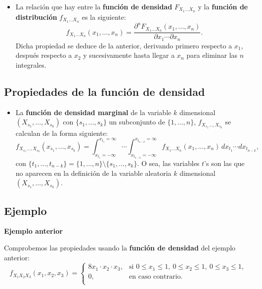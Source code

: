 \documentclass[]{book}
\providecommand{\tightlist}{%
  \setlength{\itemsep}{0pt}\setlength{\parskip}{0pt}}
\begin{document}
\begin{itemize}
\tightlist
\item
  La relación que hay entre la \textbf{función de densidad} \(F_{X_1\ldots X_n}\) y la \textbf{función de distribución} \(f_{X_1\ldots X_n}\) es la siguiente:
  \[
  f_{X_1\ldots X_n}(x_1,\ldots,x_n)=\frac{\partial^n F_{X_1\ldots X_n}(x_1,\ldots,x_n)}{\partial x_1\cdots\partial x_n}.
  \]
  Dicha propiedad se deduce de la anterior, derivando primero respecto a \(x_1\), después respecto a \(x_2\) y sucesivamente hasta llegar a \(x_n\) para eliminar las \(n\) integrales.
\end{itemize}

\hypertarget{propiedades-de-la-funciuxf3n-de-densidad-6}{%
\subsection{Propiedades de la función de densidad}\label{propiedades-de-la-funciuxf3n-de-densidad-6}}

\begin{itemize}
\tightlist
\item
  La \textbf{función de densidad marginal} de la variable \(k\) dimensional \((X_{s_1},\ldots,X_{s_k})\) con \(\{s_1,\ldots, s_k\}\) un subconjunto de \(\{1,\ldots,n\}\), \(f_{X_{s_1}\ldots,X_{s_k}}\) se calculan de la forma siguiente:
  \[
  f_{X_{s_1}\ldots,X_{s_k}}(x_{s_1},\ldots,x_{s_k})=\int_{x_{t_1}=-\infty}^{x_{t_1}=\infty}\cdots \int_{x_{t_{n-k}}=-\infty}^{x_{t_{n-k}}=\infty} f_{X_1\ldots X_n}(x_1,\ldots,x_n)\, dx_{t_1}\cdots dx_{t_{n-k}},
  \]
  con \(\{t_1,\ldots,t_{n-k}\}=\{1,\ldots,n\}\setminus \{s_1,\ldots,s_k\}.\) O sea, las variables \(t\)'s son las que no aparecen en la definición de la variable aleatoria \(k\) dimensional \((X_{s_1},\ldots,X_{s_k})\).
\end{itemize}

\hypertarget{ejemplo-99}{%
\subsection{Ejemplo}\label{ejemplo-99}}

\textbf{Ejemplo anterior}

Comprobemos las propiedades usando la \textbf{función de densidad} del ejemplo anterior:
\[
f_{X_1X_2X_3}(x_1,x_2,x_3)=\begin{cases}
8 x_1\cdot x_2\cdot x_3, & \mbox{si }0\leq x_1\leq 1,\ 0\leq x_2\leq 1,\ 0\leq x_3\leq 1, \\
0, & \mbox{en caso contrario.}\\
\end{cases}
\]
\end{document}
